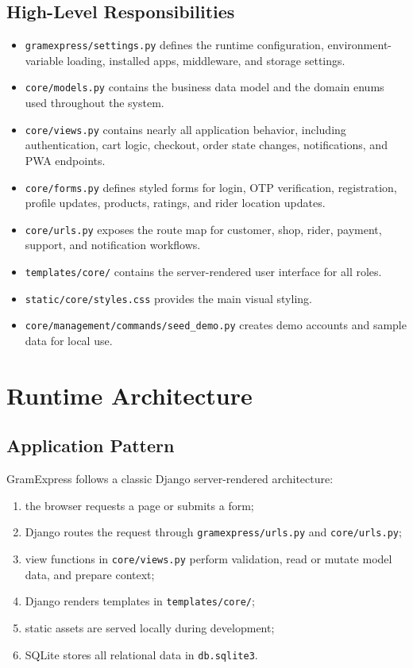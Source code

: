 \documentclass[12pt,a4paper]{article}
\begin{document}
\subsection{High-Level Responsibilities}
\begin{itemize}[leftmargin=1.5em]
    \item \texttt{gramexpress/settings.py} defines the runtime configuration, environment-variable loading, installed apps, middleware, and storage settings.
    \item \texttt{core/models.py} contains the business data model and the domain enums used throughout the system.
    \item \texttt{core/views.py} contains nearly all application behavior, including authentication, cart logic, checkout, order state changes, notifications, and PWA endpoints.
    \item \texttt{core/forms.py} defines styled forms for login, OTP verification, registration, profile updates, products, ratings, and rider location updates.
    \item \texttt{core/urls.py} exposes the route map for customer, shop, rider, payment, support, and notification workflows.
    \item \texttt{templates/core/} contains the server-rendered user interface for all roles.
    \item \texttt{static/core/styles.css} provides the main visual styling.
    \item \texttt{core/management/commands/seed\_demo.py} creates demo accounts and sample data for local use.
\end{itemize}

\section{Runtime Architecture}
\subsection{Application Pattern}
GramExpress follows a classic Django server-rendered architecture:
\begin{enumerate}[leftmargin=1.5em]
    \item the browser requests a page or submits a form;
    \item Django routes the request through \texttt{gramexpress/urls.py} and \texttt{core/urls.py};
    \item view functions in \texttt{core/views.py} perform validation, read or mutate model data, and prepare context;
    \item Django renders templates in \texttt{templates/core/};
    \item static assets are served locally during development;
    \item SQLite stores all relational data in \texttt{db.sqlite3}.
\end{enumerate}
\end{document}
